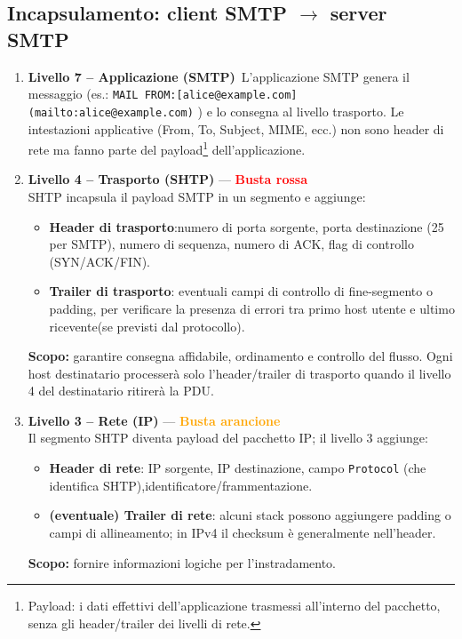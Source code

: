 \documentclass[a4paper,12pt]{report}
\begin{document}
\subsection*{Incapsulamento: client SMTP $\rightarrow$ server SMTP }
\begin{enumerate}
\item \textbf{Livello 7 -- Applicazione (SMTP)}\
L’applicazione SMTP genera il messaggio (es.: \texttt{MAIL FROM:[alice@example.com](mailto:alice@example.com)} ) e lo consegna al livello trasporto. Le intestazioni applicative (From, To, Subject, MIME, ecc.) non sono header di rete ma fanno parte del payload\footnote{Payload: i dati effettivi dell’applicazione trasmessi all’interno del pacchetto, senza gli header/trailer dei livelli di rete.}
 dell’applicazione.


\item \textbf{Livello 4 -- Trasporto (SHTP)} — \textcolor{red}{\textbf{Busta rossa}}\\
SHTP incapsula il payload SMTP in un segmento e aggiunge:
\begin{itemize}
    \item \textbf{Header di trasporto}:numero di porta sorgente, porta destinazione (25 per SMTP), numero di sequenza, numero di ACK, flag di controllo (SYN/ACK/FIN).
        \item \textbf{Trailer di trasporto}: eventuali campi di controllo di fine-segmento o padding, per verificare la presenza di errori tra primo host utente e ultimo ricevente(se previsti dal protocollo).
\end{itemize}
\textbf{Scopo:} garantire consegna affidabile, ordinamento e controllo del flusso. Ogni host destinatario processerà solo l’header/trailer di trasporto quando il livello 4 del destinatario ritirerà la PDU.

\item \textbf{Livello 3 -- Rete (IP)} — \textcolor{orange}{\textbf{Busta arancione}}\\
Il segmento SHTP diventa payload del pacchetto IP; il livello 3 aggiunge:
\begin{itemize}
    \item \textbf{Header di rete}: IP sorgente, IP destinazione, campo \texttt{Protocol} (che identifica SHTP),identificatore/frammentazione.
    \item \textbf{(eventuale) Trailer di rete}: alcuni stack possono aggiungere padding o campi di allineamento; in IPv4 il checksum è generalmente nell’header.
\end{itemize}
\textbf{Scopo:} fornire informazioni logiche per l’instradamento.


\end{enumerate}
\end{document}
